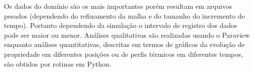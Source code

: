     Os dados do domínio são os mais importantes porém resultam em arquivos
    pesados (dependendo do refinamento da malha e do tamanho do incremento de
    tempo). Portanto dependendo da simulação o intervalo de registro dos dados
    pode ser maior ou menor. Análises qualitativas são realizadas usando o
    Paraview enquanto análises quantitativas, descritas em termos de gráficos da
    evolução de propriedade em diferentes posições ou de perfis térmicos em
    diferentes tempos, são obtidos por rotinas em Python.



    
